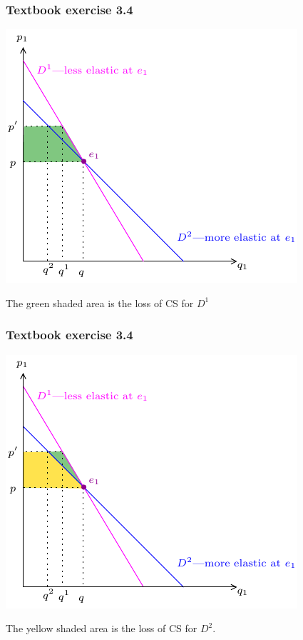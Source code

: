 \documentclass[xcolor=pdftex,dvipsnames]{beamer}
\begin{document}
\begin{frame}
\frametitle{Textbook exercise 3.4}
\begin{center}\includegraphics{pics/Exercise32}\end{center}
The green shaded area is the loss of CS for $D^1$
\end{frame}



\begin{frame}
\frametitle{Textbook exercise 3.4}
\begin{center}\includegraphics{pics/Exercise33}\end{center}
The yellow shaded area is the loss of CS for $D^2$. 
\end{frame}
\end{document}
